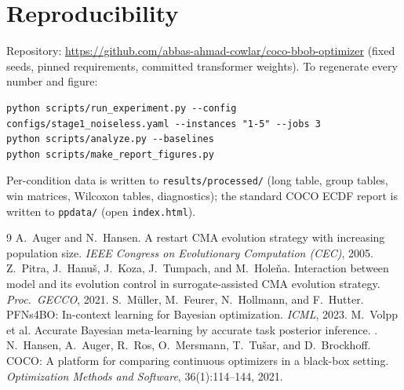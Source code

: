 \documentclass[11pt,a4paper]{article}
\begin{document}
\section{Reproducibility}
Repository: \url{https://github.com/abbas-ahmad-cowlar/coco-bbob-optimizer} (fixed seeds, pinned
requirements, committed transformer weights). To regenerate every number and figure:
\begin{verbatim}
python scripts/run_experiment.py --config configs/stage1_noiseless.yaml --instances "1-5" --jobs 3
python scripts/analyze.py --baselines
python scripts/make_report_figures.py
\end{verbatim}
Per-condition data is written to \texttt{results/processed/} (long table, group tables, win
matrices, Wilcoxon tables, diagnostics); the standard COCO ECDF report is written to
\texttt{ppdata/} (open \texttt{index.html}).

\begin{thebibliography}{9}
 A.~Auger and N.~Hansen.
\newblock A restart CMA evolution strategy with increasing population size.
\newblock \emph{IEEE Congress on Evolutionary Computation (CEC)}, 2005.
 Z.~Pitra, J.~Hanu\v{s}, J.~Koza, J.~Tumpach, and M.~Hole\v{n}a.
\newblock Interaction between model and its evolution control in surrogate-assisted CMA
evolution strategy.
\newblock \emph{Proc.\ GECCO}, 2021.
 S.~M\"uller, M.~Feurer, N.~Hollmann, and F.~Hutter.
\newblock PFNs4BO: In-context learning for Bayesian optimization.
\newblock \emph{ICML}, 2023.
 M.~Volpp et al.
\newblock Accurate Bayesian meta-learning by accurate task posterior inference.
.
 N.~Hansen, A.~Auger, R.~Ros, O.~Mersmann, T.~Tu\v{s}ar, and D.~Brockhoff.
\newblock COCO: A platform for comparing continuous optimizers in a black-box setting.
\newblock \emph{Optimization Methods and Software}, 36(1):114--144, 2021.
\end{thebibliography}
\end{document}

